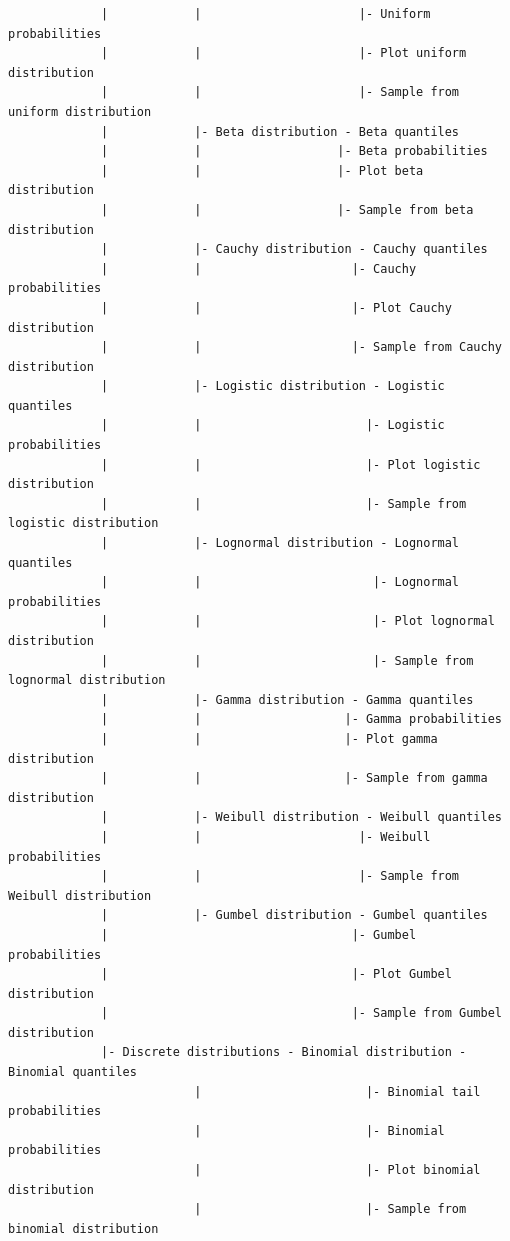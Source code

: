 \documentclass{article}%
\begin{document}
\begin{verbatim}
             |            |                      |- Uniform probabilities
             |            |                      |- Plot uniform distribution
             |            |                      |- Sample from uniform distribution
             |            |- Beta distribution - Beta quantiles
             |            |                   |- Beta probabilities
             |            |                   |- Plot beta distribution
             |            |                   |- Sample from beta distribution
             |            |- Cauchy distribution - Cauchy quantiles
             |            |                     |- Cauchy probabilities
             |            |                     |- Plot Cauchy distribution
             |            |                     |- Sample from Cauchy distribution
             |            |- Logistic distribution - Logistic quantiles
             |            |                       |- Logistic probabilities
             |            |                       |- Plot logistic distribution
             |            |                       |- Sample from logistic distribution
             |            |- Lognormal distribution - Lognormal quantiles
             |            |                        |- Lognormal probabilities
             |            |                        |- Plot lognormal distribution
             |            |                        |- Sample from lognormal distribution
             |            |- Gamma distribution - Gamma quantiles
             |            |                    |- Gamma probabilities
             |            |                    |- Plot gamma distribution
             |            |                    |- Sample from gamma distribution
             |            |- Weibull distribution - Weibull quantiles
             |            |                      |- Weibull probabilities
             |            |                      |- Sample from Weibull distribution
             |            |- Gumbel distribution - Gumbel quantiles
             |                                  |- Gumbel probabilities
             |                                  |- Plot Gumbel distribution
             |                                  |- Sample from Gumbel distribution
             |- Discrete distributions - Binomial distribution - Binomial quantiles
                          |                       |- Binomial tail probabilities
                          |                       |- Binomial probabilities
                          |                       |- Plot binomial distribution
                          |                       |- Sample from binomial distribution

\end{verbatim}
\end{document}
